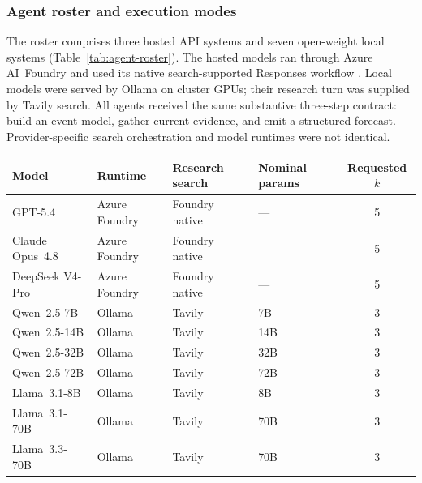 \subsubsection{Agent roster and execution modes}
\label{app:agent-roster}

The roster comprises three hosted API systems and seven open-weight local systems
(Table~\ref{tab:agent-roster}).  The hosted models ran through Azure AI~Foundry and used
its native search-supported Responses workflow \citep{microsoft2026foundry}.  Local
models were served by Ollama \citep{ollama2026} on cluster GPUs; their research turn was supplied by Tavily search.  All agents received the same substantive three-step contract: build an event
model, gather current evidence, and emit a structured forecast. Provider-specific
search orchestration and model runtimes were not identical.

\begin{center}
\begin{minipage}{\linewidth}
\centering
{}
\label{tab:agent-roster}
\small
\begin{tabular}{llllc}
\toprule
\textbf{Model} & \textbf{Runtime} & \textbf{Research search} &
\textbf{Nominal params} & \textbf{Requested $k$} \\
\midrule
GPT-5.4          & Azure Foundry & Foundry native & --- & 5 \\
Claude Opus~4.8  & Azure Foundry & Foundry native & --- & 5 \\
DeepSeek V4-Pro  & Azure Foundry & Foundry native & --- & 5 \\
Qwen~2.5-7B      & Ollama & Tavily & 7B  & 3 \\
Qwen~2.5-14B     & Ollama & Tavily & 14B & 3 \\
Qwen~2.5-32B     & Ollama & Tavily & 32B & 3 \\
Qwen~2.5-72B     & Ollama & Tavily & 72B & 3 \\
Llama~3.1-8B     & Ollama & Tavily & 8B  & 3 \\
Llama~3.1-70B    & Ollama & Tavily & 70B & 3 \\
Llama~3.3-70B    & Ollama & Tavily & 70B & 3 \\
\bottomrule
\end{tabular}
\end{minipage}
\end{center}

